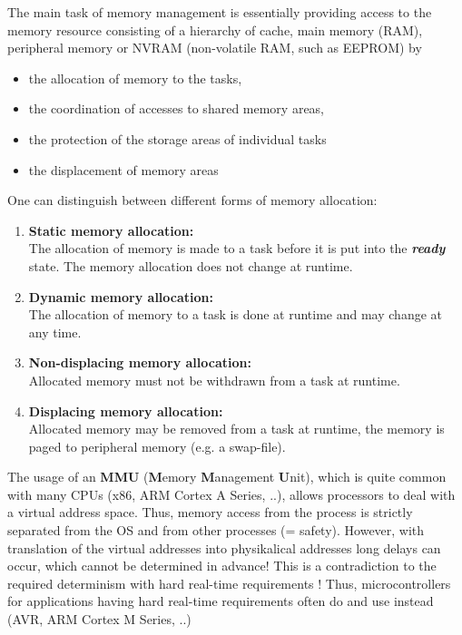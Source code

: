 The main task of memory management is essentially providing access to the memory resource consisting of a hierarchy of cache, main memory (RAM), peripheral memory or NVRAM (non-volatile RAM, such as EEPROM) by

\begin{itemize}
	\item  the allocation of memory to the tasks,
	\item  the coordination of accesses to shared memory areas,
	\item  the protection of the storage areas of individual tasks
	\item  the displacement of memory areas
\end{itemize}
\os{\newpage}

One can distinguish between different forms of memory allocation:

\begin{enumerate}
\item  \textbf{Static memory allocation: \\}The allocation of memory is made to a task before it is put into the \textbf{\textit{ready}} state. The memory allocation does not change at runtime.

\item  \textbf{Dynamic memory allocation: }\\The allocation of memory to a task is done at runtime and may change at any time.

\item  \textbf{Non-displacing memory allocation: }\\Allocated memory must not be withdrawn from a task at runtime.

\item  \textbf{Displacing memory allocation: }\\Allocated memory may be removed from a task at runtime, the memory is paged to peripheral memory (e.g. a swap-file).
\end{enumerate}

\os{\newpage}

The usage of an \textbf{MMU} (\textbf{M}emory \textbf{M}anagement \textbf{U}nit), which is quite common with many CPUs (x86, ARM Cortex A Series, ..), allows processors to deal with a virtual address space. Thus, memory access from the process is strictly separated from the OS and from other processes (= safety). However, with translation of the virtual addresses into physikalical addresses long delays can occur, which cannot be determined in advance! This is a contradiction to the required determinism with hard real-time requirements ! Thus, microcontrollers for applications having hard real-time requirements often do \textbf{} and use  instead (AVR, ARM Cortex M Series, ..) 

